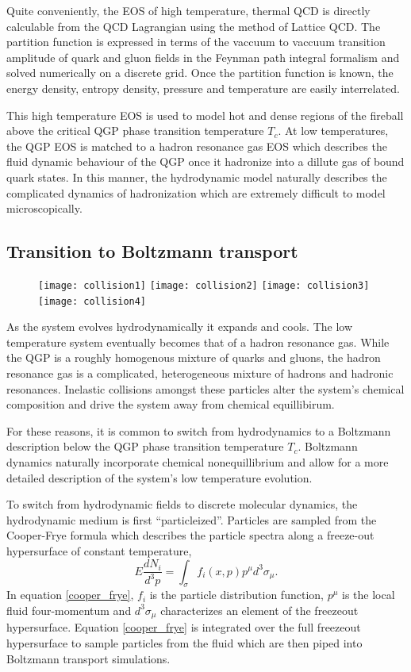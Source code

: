 \documentclass[aps,prc,reprint,amsmath,nofootinbib]{revtex4-1}
\begin{document}
Quite conveniently, the EOS of high temperature, thermal QCD is directly calculable from the QCD Lagrangian using the method of Lattice QCD. The partition function
is expressed in terms of the vaccuum to vaccuum transition amplitude of quark and gluon fields in the Feynman path integral formalism and solved numerically on a
discrete grid. Once the partition function is known, the energy density, entropy density, pressure and temperature are easily interrelated. 

This high temperature EOS is used to model hot and dense regions of the fireball above the critical QGP phase transition temperature $T_c$. At low temperatures,
the QGP EOS is matched to a hadron resonance gas EOS which describes the fluid dynamic behaviour of the QGP once it hadronize into a dillute gas of bound quark
states. In this manner, the hydrodynamic model naturally describes the complicated dynamics of hadronization which are extremely difficult to model microscopically.

\subsection{Transition to Boltzmann transport}

\begin{figure}
 \texttt{[image: collision1]}
 \texttt{[image: collision2]}
 \texttt{[image: collision3]}
 \texttt{[image: collision4]}
 \caption{\label{fig:spacetime}}
\end{figure}

As the system evolves hydrodynamically it expands and cools. The low temperature system eventually becomes that of a hadron resonance gas. While the QGP is a 
roughly homogenous mixture of quarks and gluons, the hadron resonance gas is a complicated, heterogeneous mixture of hadrons and hadronic resonances. Inelastic collisions 
amongst these particles alter the system's chemical composition and drive the system away from chemical equillibirum. 

For these reasons, it is common to switch from hydrodynamics to a Boltzmann description below the QGP phase transition temperature $T_c$. Boltzmann dynamics naturally 
incorporate chemical nonequillibrium and allow for a more detailed description of the system's low temperature evolution.

To switch from hydrodynamic fields to discrete molecular dynamics, the hydrodynamic medium is first ``particleized''. Particles are sampled from the Cooper-Frye formula 
which describes the particle spectra along a freeze-out hypersurface of constant temperature,
\begin{equation}
 \label{cooper_frye}
 E \frac{dN_i}{d^3p} = \int_\sigma f_i(x,p) p^\mu d^3\sigma_\mu.
\end{equation}
In equation \ref{cooper_frye}, $f_i$ is the particle distribution function, $p^\mu$ is the local fluid four-momentum and $d^3\sigma_\mu$ characterizes an element of the freezeout hypersurface. Equation
\ref{cooper_frye} is integrated over the full freezeout hypersurface to sample particles from the fluid which are then piped into Boltzmann transport simulations.
\end{document}
